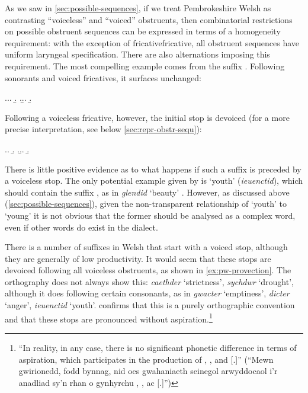 As we saw in \cref{sec:possible-sequences}, if we treat Pembrokeshire Welsh as contrasting \enquote{voiceless} and \enquote{voiced} obstruents, then combinatorial restrictions on possible obstruent sequences can be expressed in terms of a homogeneity requirement: with the exception of fricative\endash fricative, all obstruent sequences have uniform laryngeal specification. There are also alternations imposing this requirement. The most compelling example comes from the suffix . Following sonorants and voiced fricatives, it surfaces unchanged:

\ex.\a.\a.
\b.
\z.\b.\a.
\b.

Following a voiceless fricative, however, the initial stop is devoiced (for a more precise interpretation, see below \cref{sec:repr-obstr-sequ}):

\ex.\label{ex:pw-provection}\a.
\b.
\z.\b.\a.
\b.

There is little positive evidence as to what happens if such a suffix is preceded by a voiceless stop. The only potential example given by \citet{awbery86:_pembr_welsh} is \ipa{[ˈjeŋktid]} `youth' (\emph{ieuenctid}), which should contain the suffix , as in \emph{glendid} `beauty' \citep[\emph{sub voce}]{fynes-clinton}. However, as discussed above (\cref{sec:possible-sequences}), given the non-transparent relationship of \ipa{[ˈjeŋktid]} `youth' to \ipa{[ˈiːvaŋk]} `young' it is not obvious that the former should be analysed as a complex word, even if other  words do exist in the dialect.

There is a number of suffixes in Welsh that start with a voiced stop, although they are generally of low productivity. It would seem that these stops are devoiced following all voiceless obstruents, as shown in \cref{ex:pw-provection}. The orthography does not always show this: \emph{caethder} `strictness', \emph{sychdwr} `drought', although it does following certain consonants, as in \emph{gwacter} `emptiness', \emph{dicter} `anger', \emph{ieuenctid} `youth'. \citet[§IV.9, note {[ch]}]{gyg} confirms that this is a purely orthographic convention and that these stops are pronounced without aspiration.\footnote{\enquote{In reality, in any case, there is no significant phonetic difference in terms of aspiration, which participates in the production of \ipa{[p]}, \ipa{[t]}, and \ipa{[k]}[.]} (\enquote{Mewn gwirionedd, fodd bynnag, nid oes gwahaniaeth seinegol arwyddocaol i'r anadliad sy'n rhan o gynhyrchu \ipa{[p]}, \ipa{[t]}, ac \ipa{[k]}[.]})}

